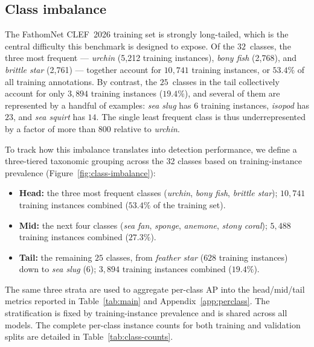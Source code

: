 \documentclass[11pt,a4paper,twocolumn]{article}
\begin{document}
\subsection{Class imbalance}
\label{sec:data-imbalance}

The FathomNet CLEF~2026 training set is strongly long-tailed, which is the
central difficulty this benchmark is designed to expose. Of the $32$~classes,
the three most frequent --- \textit{urchin} (5{,}212 training instances),
\textit{bony fish} (2{,}768), and \textit{brittle star} (2{,}761) ---
together account for $10{,}741$ training instances, or $53.4\%$ of all
training annotations. By contrast, the $25$~classes in the tail collectively
account for only $3{,}894$ training instances ($19.4\%$), and several of them
are represented by a handful of examples: \textit{sea slug} has $6$ training
instances, \textit{isopod} has $23$, and \textit{sea squirt} has $14$. The
single least frequent class is thus underrepresented by a factor of more than
$800$ relative to \textit{urchin}.

To track how this imbalance translates into detection performance, we define
a three-tiered taxonomic grouping across the 32 classes based on
training-instance prevalence (Figure~\ref{fig:class-imbalance}):

\begin{itemize}
  \item \textbf{Head:} the three most frequent classes
        (\textit{urchin}, \textit{bony fish}, \textit{brittle star});
        $10{,}741$ training instances combined ($53.4\%$ of the training set).
  \item \textbf{Mid:} the next four classes
        (\textit{sea fan}, \textit{sponge}, \textit{anemone},
        \textit{stony coral}); $5{,}488$ training instances combined ($27.3\%$).
  \item \textbf{Tail:} the remaining $25$ classes, from
        \textit{feather star} ($628$ training instances) down to
        \textit{sea slug} ($6$); $3{,}894$ training instances combined ($19.4\%$).
\end{itemize}

The same three strata are used to aggregate per-class AP into the
head/mid/tail metrics reported in Table~\ref{tab:main} and
Appendix~\ref{app:perclass}. The stratification is fixed by training-instance
prevalence and is shared across all models. The complete per-class instance
counts for both training and validation splits are detailed in
Table~\ref{tab:class-counts}.
\end{document}
